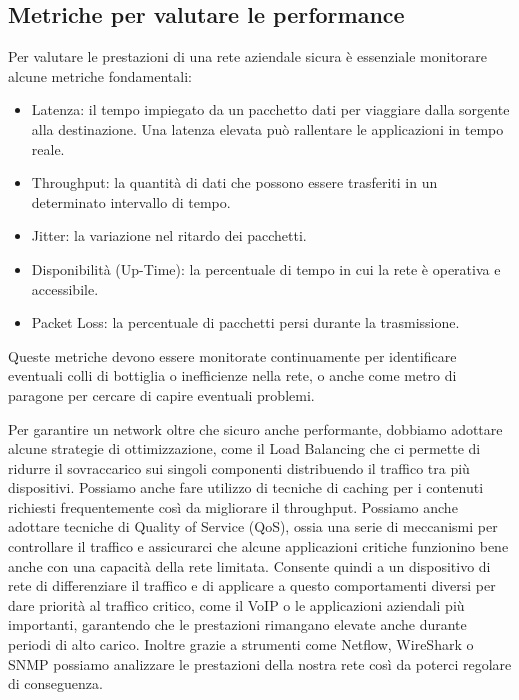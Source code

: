             \subsection{Metriche per valutare le performance}
            Per valutare le prestazioni di una rete aziendale sicura è essenziale monitorare alcune metriche fondamentali:
            \begin{itemize}
                \item Latenza: il tempo impiegato da un pacchetto dati per viaggiare dalla sorgente alla destinazione. Una latenza elevata può rallentare le applicazioni in tempo reale.
                \item Throughput: la quantità di dati che possono essere trasferiti in un determinato intervallo di tempo. 
                \item Jitter: la variazione nel ritardo dei pacchetti.
                \item Disponibilità (Up-Time): la percentuale di tempo in cui la rete è operativa e accessibile.
                \item Packet Loss: la percentuale di pacchetti persi durante la trasmissione. 
            \end{itemize}
            Queste metriche devono essere monitorate continuamente per identificare eventuali colli di bottiglia o inefficienze nella rete, o anche come metro di paragone per cercare di capire eventuali problemi.
            
            Per garantire un network oltre che sicuro anche performante, dobbiamo adottare alcune strategie di ottimizzazione, come il Load Balancing che ci permette di ridurre il sovraccarico sui singoli componenti distribuendo il traffico tra più dispositivi. Possiamo anche fare utilizzo di tecniche di caching per i contenuti richiesti frequentemente così da migliorare il throughput. Possiamo anche adottare tecniche di Quality of Service (QoS), ossia una serie di meccanismi per controllare il traffico e assicurarci che alcune applicazioni critiche funzionino bene anche con una capacità della rete limitata. Consente quindi a un dispositivo di rete di differenziare il traffico e di applicare a questo comportamenti diversi  per dare priorità al traffico critico, come il VoIP o le applicazioni aziendali più importanti, garantendo che le prestazioni rimangano elevate anche durante periodi di alto carico.
            Inoltre grazie a strumenti come Netflow, WireShark o SNMP possiamo analizzare le prestazioni della nostra rete così da poterci regolare di conseguenza.

